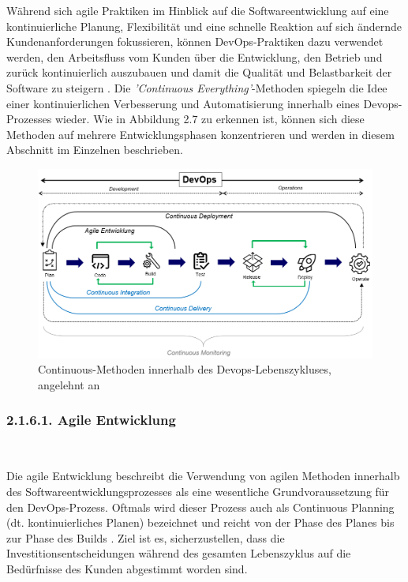 Während sich agile Praktiken im Hinblick auf die Softwareentwicklung auf eine kontinuierliche Planung, Flexibilität und eine schnelle Reaktion auf sich ändernde Kundenanforderungen fokussieren, können DevOps-Praktiken dazu verwendet werden, den Arbeitsfluss vom Kunden über die Entwicklung, den Betrieb und zurück kontinuierlich auszubauen und damit die Qualität und Belastbarkeit der Software zu steigern \cite{fitzgerald_continuous_2014} \cite[S. 264]{tokarski_strategische_2018}. Die \textit{'Continuous Everything'}-Methoden spiegeln die Idee einer kontinuierlichen Verbesserung und Automatisierung innerhalb eines Devops-Prozesses wieder. Wie in Abbildung 2.7 zu erkennen ist, können sich diese Methoden auf mehrere Entwicklungsphasen konzentrieren und werden in diesem Abschnitt im Einzelnen beschrieben.  

\begin{figure}[h]
    \centering
    \includegraphics[scale=0.5]{Bilder/Continuous Everything.png}
    \caption{Continuous-Methoden innerhalb des Devops-Lebenszykluses, angelehnt an \cite[S. 16]{halstenberg_devops_2020}}
\end{figure}

\subsubsection{2.1.6.1. Agile Entwicklung} $~$

Die agile Entwicklung beschreibt die Verwendung von agilen Methoden innerhalb des Softwareentwicklungsprozesses als eine wesentliche Grundvoraussetzung für den DevOps-Prozess. Oftmals wird dieser Prozess auch als Continuous Planning (dt. kontinuierliches Planen) bezeichnet und reicht von der Phase des Planes bis zur Phase des Builds \cite{fitzgerald_continuous_2014}. Ziel ist es, sicherzustellen, dass die Investitionsentscheidungen während des gesamten Lebenszyklus auf die Bedürfnisse des Kunden abgestimmt worden sind. 

